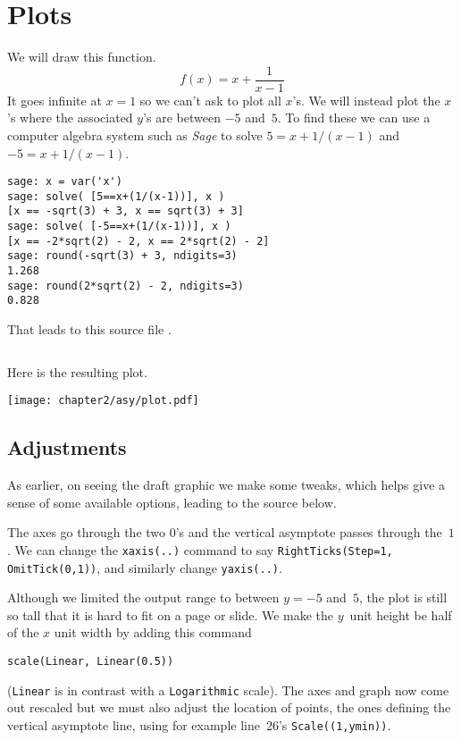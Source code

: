 \chapter{Plots}
We will draw this function.
\begin{equation*}
  f(x)=x+\frac{1}{x-1}
\end{equation*}
It goes infinite at $x=1$ so
we can't ask \Asy{} to plot all $x$'s. 
We will instead plot the $x$'s where the associated $y$'s 
are between $-5$ and~$5$. 
To find these
we can use a computer algebra system such as \textit{Sage} to solve
$5=x+1/(x-1)$ and $-5=x+1/(x-1)$.
\begin{verbatim}
sage: x = var('x')
sage: solve( [5==x+(1/(x-1))], x )
[x == -sqrt(3) + 3, x == sqrt(3) + 3]
sage: solve( [-5==x+(1/(x-1))], x )
[x == -2*sqrt(2) - 2, x == 2*sqrt(2) - 2]
sage: round(-sqrt(3) + 3, ndigits=3)
1.268
sage: round(2*sqrt(2) - 2, ndigits=3)
0.828
\end{verbatim}
That leads to this source file .
\begin{center}
  \inputminted{Asymptote}{chapter2/asy/plot.asy}
\end{center}
Here is the resulting plot.
\begin{center}
  \texttt{[image: chapter2/asy/plot.pdf]}
\end{center}



\section{Adjustments}
As earlier, on seeing the draft graphic we make some tweaks, 
which helps give a sense of some available options,
leading to the 
source  below.

The axes go through the two $0$'s
and the vertical asymptote passes through the~$1$.
We can change the \texttt{xaxis(..)}
command to say \texttt{RightTicks(Step=1, OmitTick(0,1))},
and similarly change \texttt{yaxis(..)}.

Although we limited the output range to between $y=-5$ and~$5$, 
the plot is still so tall that it is hard to fit on a page or slide.
We make the $y$~unit height be half of the $x$ unit width by adding this command
\begin{verbatim}
scale(Linear, Linear(0.5))
\end{verbatim}
(\texttt{Linear} is in contrast with a 
\texttt{Logarithmic} scale).
The axes and graph now come out rescaled but
we must also adjust the location
of points, the ones defining the vertical asymptote line, using for example 
line~26's \texttt{Scale((1,ymin))}.

